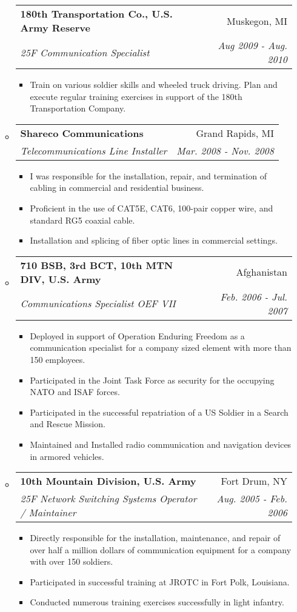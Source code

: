 \documentclass[letterpaper,11pt]{article}
\makeatletter
\newcommand{\resitem}[1]{\item #1 \vspace{-2pt}}
\newcommand{\ressubheading}[4]{
\begin{tabular*}{7.0in}{l@{\extracolsep{\fill}}r}
		\textbf{#1} & #2 \\
		\textit{#3} & \textit{#4} \\
\end{tabular*}\vspace{-6pt}}
\makeatother
\begin{document}
\begin{itemize}
\begin{itemize}
\vspace{0.1in}

	\ressubheading{180th Transportation Co., U.S. Army Reserve}{Muskegon, MI}{25F Communication Specialist}{Aug 2009 - Aug. 2010}
	\begin{itemize}
		\resitem{Train on various soldier skills and wheeled truck driving. Plan and execute regular training exercises in support of the 180th Transportation Company.}
	\end{itemize}
\item

\vspace{0.1in}

	\ressubheading{Shareco Communications}{Grand Rapids, MI}{Telecommunications Line Installer}{Mar. 2008 - Nov. 2008}
	\begin{itemize}
		\resitem{I was responsible for the installation, repair, and termination of cabling in commercial and residential business.}
		\resitem{Proficient in the use of  CAT5E, CAT6, 100-pair copper wire, and standard RG5 coaxial cable.}
		\resitem{Installation and splicing of fiber optic lines in commercial settings.}
	\end{itemize}

\item

\pagebreak
	\ressubheading{710 BSB, 3rd BCT, 10th MTN DIV, U.S. Army}{Afghanistan}{Communications Specialist OEF VII}{Feb. 2006 - Jul. 2007}
	\begin{itemize}
		\resitem{Deployed in support of Operation Enduring Freedom as a communication specialist for a company sized element with more than 150 employees. }
		\resitem{Participated in the Joint Task Force as security for the occupying NATO and ISAF forces.}
		\resitem{Participated in the successful repatriation of a US Soldier in a Search and Rescue Mission.}
		\resitem{Maintained and Installed radio communication and navigation devices in armored vehicles.}
	\end{itemize}

\item
	\ressubheading{10th Mountain Division, U.S. Army}{Fort Drum, NY}{25F Network Switching Systems Operator / Maintainer }{Aug. 2005 - Feb. 2006}
	\begin{itemize}
		\resitem{Directly responsible for the installation, maintenance, and repair of over half a million dollars of communication equipment for a company with over 150 soldiers.}
		\resitem{Participated in successful training at JROTC in Fort Polk, Louisiana.}
		\resitem{Conducted numerous training exercises successfully in light infantry.}
	\end{itemize}


\end{itemize}
\end{itemize}
\end{document}
